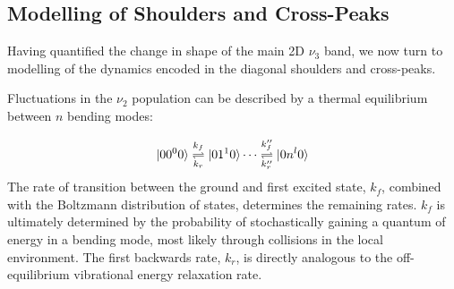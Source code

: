 \documentclass[%
  class = book,%
  crop = false,%
  float = true,%
  multi = true,%
  preview = false,%
]{standalone}
\begin{document}
{\subsection{Modelling of Shoulders and Cross-Peaks}
\label{sec:shoulders_modeling}

Having quantified the change in shape of the main 2D \(\nu_3\) band, we now turn to modelling of the dynamics encoded in the diagonal shoulders and cross-peaks.

Fluctuations in the  \(\nu_2\) population can be described by a thermal equilibrium between \(n\) bending modes:

\begin{equation}
  \label{eq:kinetic}
  \ket{00^00} \overset{k_{f}}{\underset{k_{r}}\rightleftharpoons} \ket{01^10} \cdots \overset{k''_{f}}{\underset{k''_{r}}\rightleftharpoons} \ket{0n^l0}
\end{equation}
The rate of transition between the ground and first excited state, \(k_f\), combined with the Boltzmann distribution of states, determines the remaining rates. \(k_f\) is ultimately determined by the probability of stochastically gaining a quantum of energy in a  bending mode, most likely through collisions in the local environment. The first backwards rate, \(k_r\), is directly analogous to the off-equilibrium vibrational energy relaxation rate.

}
\end{document}
